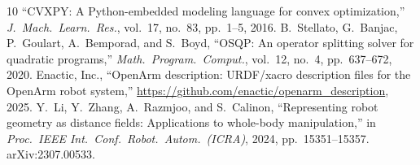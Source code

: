 \documentclass[10pt,conference]{IEEEtran}
\theoremstyle{remark}
\theoremstyle{plain}
\begin{document}
\begin{thebibliography}{10}
``CVXPY: A Python-embedded modeling language for convex
optimization,''
\textit{J.~Mach.\ Learn.\ Res.}, vol.~17, no.~83, pp.~1--5, 2016.
 B.~Stellato, G.~Banjac, P.~Goulart, A.~Bemporad,
and S.~Boyd,
``OSQP: An operator splitting solver for quadratic programs,''
\textit{Math.\ Program.\ Comput.}, vol.~12, no.~4, pp.~637--672, 2020.
 Enactic, Inc.,
``OpenArm description: URDF/xacro description files for the
OpenArm robot system,''
\url{https://github.com/enactic/openarm_description}, 2025.
 Y.~Li, Y.~Zhang, A.~Razmjoo, and S.~Calinon,
``Representing robot geometry as distance fields: Applications
to whole-body manipulation,''
in \textit{Proc.\ IEEE Int.\ Conf.\ Robot.\ Autom.\ (ICRA)}, 2024,
pp.~15351--15357. arXiv:2307.00533.
\end{thebibliography}
\end{document}
